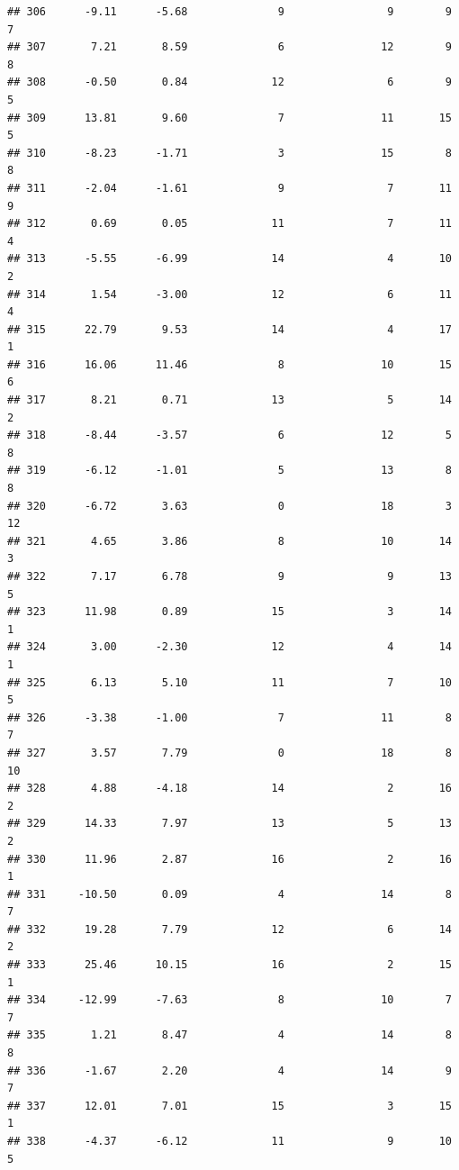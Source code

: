 \documentclass[]{book}
\begin{document}
\begin{verbatim}
## 306      -9.11      -5.68              9                9        9          7
## 307       7.21       8.59              6               12        9          8
## 308      -0.50       0.84             12                6        9          5
## 309      13.81       9.60              7               11       15          5
## 310      -8.23      -1.71              3               15        8          8
## 311      -2.04      -1.61              9                7       11          9
## 312       0.69       0.05             11                7       11          4
## 313      -5.55      -6.99             14                4       10          2
## 314       1.54      -3.00             12                6       11          4
## 315      22.79       9.53             14                4       17          1
## 316      16.06      11.46              8               10       15          6
## 317       8.21       0.71             13                5       14          2
## 318      -8.44      -3.57              6               12        5          8
## 319      -6.12      -1.01              5               13        8          8
## 320      -6.72       3.63              0               18        3         12
## 321       4.65       3.86              8               10       14          3
## 322       7.17       6.78              9                9       13          5
## 323      11.98       0.89             15                3       14          1
## 324       3.00      -2.30             12                4       14          1
## 325       6.13       5.10             11                7       10          5
## 326      -3.38      -1.00              7               11        8          7
## 327       3.57       7.79              0               18        8         10
## 328       4.88      -4.18             14                2       16          2
## 329      14.33       7.97             13                5       13          2
## 330      11.96       2.87             16                2       16          1
## 331     -10.50       0.09              4               14        8          7
## 332      19.28       7.79             12                6       14          2
## 333      25.46      10.15             16                2       15          1
## 334     -12.99      -7.63              8               10        7          7
## 335       1.21       8.47              4               14        8          8
## 336      -1.67       2.20              4               14        9          7
## 337      12.01       7.01             15                3       15          1
## 338      -4.37      -6.12             11                9       10          5

\end{verbatim}
\end{document}
